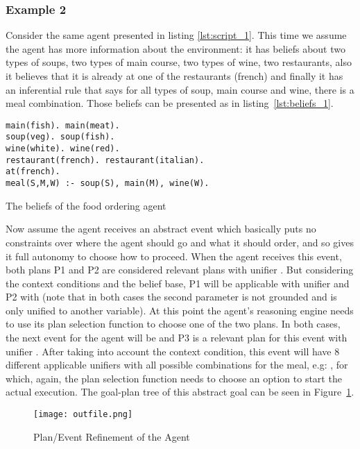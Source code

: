 \documentclass[sigconf,anonymous]{aamas}
\begin{document}
\subsubsection*{Example 2}
Consider the same agent presented in listing \ref{lst:script_1}. This time we assume the agent has more information about the environment: it has beliefs about two types of soups, two types of main course, two types of wine, two restaurants, also it believes that it is already at one of the restaurants (french) and finally it has an inferential rule that says for all types of soup, main course and wine, there is a meal combination. Those beliefs can be presented as in listing~\ref{lst:beliefs_1}.

\begin{listing}[!tbh]
\centering
\begin{verbatim}
main(fish). main(meat).
soup(veg). soup(fish).
wine(white). wine(red).
restaurant(french). restaurant(italian).
at(french).
meal(S,M,W) :- soup(S), main(M), wine(W).
\end{verbatim}
    \caption{The beliefs of the food ordering agent}
    \label{lst:beliefs_1}
\end{listing}


Now assume the agent receives an abstract event  which basically puts no constraints over where the agent should go and what it should order, and so gives it full autonomy to choose how to proceed. When the agent receives this event, both plans P1 and P2 are considered relevant plans with unifier . But considering the context conditions and the belief base, P1 will be applicable with unifier  and P2 with  (note that in both cases the second parameter is not grounded and is only unified to another variable). At this point the agent's reasoning engine needs to use its plan selection function to choose one of the two plans. In both cases, the next event for the agent will be  and P3 is a relevant plan for this event with unifier .  After taking into account the context condition, this event will have 8 different applicable unifiers with all possible combinations for the meal, e.g: , for which, again, the plan selection function needs to choose an option to start the actual execution. The goal-plan tree of this abstract goal can be seen in Figure~\ref{fig:gp-tree}.

\begin{figure}[!tbh]
  \centering
  \texttt{[image: outfile.png]}
  \caption{Plan/Event Refinement of the Agent}
  \label{fig:gp-tree}
\end{figure}
\end{document}
